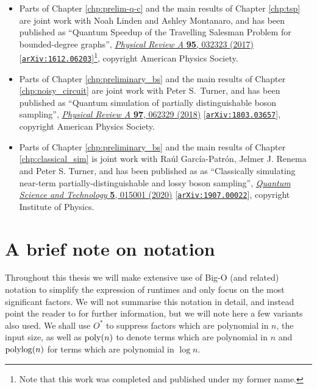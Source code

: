 \begin{itemize}
\item Parts of Chapter \ref{chp:prelim-q-c} and the main results of Chapter \ref{chp:tsp} are joint work with Noah Linden and Ashley Montanaro, and has been published as ``Quantum Speedup of the Travelling Salesman Problem for bounded-degree graphs'', \href{https://link.aps.org/doi/10.1103/PhysRevA.95.032323}{\textit{Physical Review A} \textbf{95}, 032323 (2017)} [{\tt \href{https://arxiv.org/abs/1612.06203}{arXiv:1612.06203}}]\footnote{Note that this work was completed and published under my former name.}, copyright American Physics Society.

\item Parts of Chapter \ref{chp:preliminary_bs} and the main results of Chapter \ref{chp:noisy_circuit} are joint work with Peter S.\ Turner, and has been published as ``Quantum simulation of partially distinguishable boson sampling'', \href{https://link.aps.org/doi/10.1103/PhysRevA.97.062329}{\textit{Physical Review A} \textbf{97}, 062329 (2018)} [{\tt \href{https://arxiv.org/abs/1803.03657}{arXiv:1803.03657}}], copyright American Physics Society.

\item Parts of Chapter \ref{chp:preliminary_bs} and the main results of Chapter \ref{chp:classical_sim} is joint work with Ra\'{u}l Garc\'{i}a-Patr\'{o}n, Jelmer J. Renema and Peter S. Turner, and has been published as as ``Classically simulating near-term partially-distinguishable and lossy boson sampling'', \href{https://iopscience.iop.org/article/10.1088/2058-9565/ab5555}{\textit{Quantum Science and Technology} \textbf{5}, 015001 (2020)} [{\tt \href{https://arxiv.org/abs/1907.00022}{arXiv:1907.00022}}], copyright Institute of Physics.
\end{itemize}

\section{A brief note on notation}
\label{sec:notation}

Throughout this thesis we will make extensive use of Big-O (and related) notation to simplify the expression of runtimes and only focus on the most significant factors. We will not summarise this notation in detail, and instead point the reader to \cite{clrs} for further information, but we will note here a few variants also used. We shall use $O^*$ to suppress factors which are polynomial in $n$, the input size, as well as $\operatorname{poly}(n)$ to denote terms which are polynomial in $n$ and $\operatorname{polylog}(n)$ for terms which are polynomial in $\log n$.

